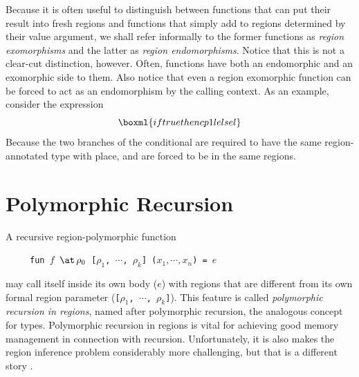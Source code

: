 \documentclass[12pt]{book}
\begin{document}
Because it is often useful to distinguish between functions that can
put their result into fresh regions and functions that simply add to
regions determined by their value argument, we shall refer informally
to the former functions as
%
{\em region exomorphisms} and the latter as
%
{\em region endomorphisms}. Notice that this is not a clear-cut
distinction, however. Often, functions have both an endomorphic and an
exomorphic side to them. Also notice that even a region exomorphic
function can be forced to act as an endomorphism by the calling
context. As an example, consider the expression
$$\boxml{if true then cp1 l else l}$$
Because the two branches of the
conditional are required to have the same region-annotated type with
place,  and  are forced to be in the same
regions.

\section{Polymorphic Recursion}

\label{polyrec.sec}
A
%
recursive region-polymorphic function
\begin{tabbing}
\ \ \ \ \ \=\tt fun $f$ $\at\,\rho_0$ [$\rho_1$, $\cdots$, $\rho_k$] ($x_1,\cdots,x_n$) = $e$
\end{tabbing}
may call itself inside its own body ($e$) with regions that are different
from its own formal region parameter ({\tt [$\rho_1$, $\cdots$, $\rho_k$]}).
This feature is called {\it polymorphic recursion in regions}, named after
polymorphic recursion, the analogous concept for types.
Polymorphic recursion in regions is vital for achieving good
memory management in connection with recursion.
Unfortunately, it is also makes  the region inference problem considerably more
challenging, but that is a different story \cite{tofbir98}.
\end{document}
